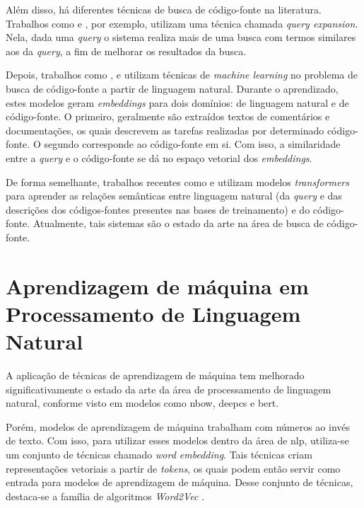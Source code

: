 Além disso, há diferentes técnicas de busca de código-fonte na literatura. Trabalhos como \textcite{Lu2015QueryEV} e \textcite{Li2016RelationshipawareCS}, por exemplo, utilizam uma técnica chamada \textit{query expansion}. Nela, dada uma \textit{query} o sistema realiza mais de uma busca com termos similares aos da \textit{query}, a fim de melhorar os resultados da busca. 

Depois, trabalhos como \textcite{Mitra2018AnIT}, \textcite{Gu2018DeepCS} e \textcite{Sun2022CodeSB} utilizam técnicas de \textit{machine learning} no problema de busca de código-fonte a partir de linguagem natural. Durante o aprendizado, estes modelos geram \textit{embeddings} para dois domínios: de linguagem natural e de código-fonte. O primeiro, geralmente são extraídos textos de comentários e documentações, os quais descrevem as tarefas realizadas por determinado código-fonte. O segundo corresponde ao código-fonte em si. Com isso, a similaridade entre a \textit{query} e o código-fonte se dá no espaço vetorial dos \textit{embeddings}.

De forma semelhante, trabalhos recentes como \textcite{Feng2020CodeBERTAP} e \textcite{Guo2021GraphCodeBERTPC} utilizam modelos \textit{transformers} para aprender as relações semânticas entre linguagem natural (da \textit{query} e das descrições dos códigos-fontes presentes nas bases de treinamento) e do código-fonte. Atualmente, tais sistemas são o estado da arte na área de busca de código-fonte.

\section{Aprendizagem de máquina em Processamento de Linguagem Natural}

A aplicação de técnicas de aprendizagem de máquina tem melhorado significativamente o estado da arte da área de processamento de linguagem natural, conforme visto em modelos como \gls{nbow}, \gls{deepcs} e \gls{bert}.

Porém, modelos de aprendizagem de máquina trabalham com números ao invés de texto. Com isso, para utilizar esses modelos dentro da área de \gls{nlp}, utiliza-se um conjunto de técnicas chamado \textit{word embedding}. Tais técnicas criam representações vetoriais a partir de \textit{tokens}, os quais podem então servir como entrada para modelos de aprendizagem de máquina. Desse conjunto de técnicas, destaca-se a família de algoritmos \textit{Word2Vec} \cite{Mikolov2013EfficientEO} \cite{Mikolov2013DistributedRO}.

